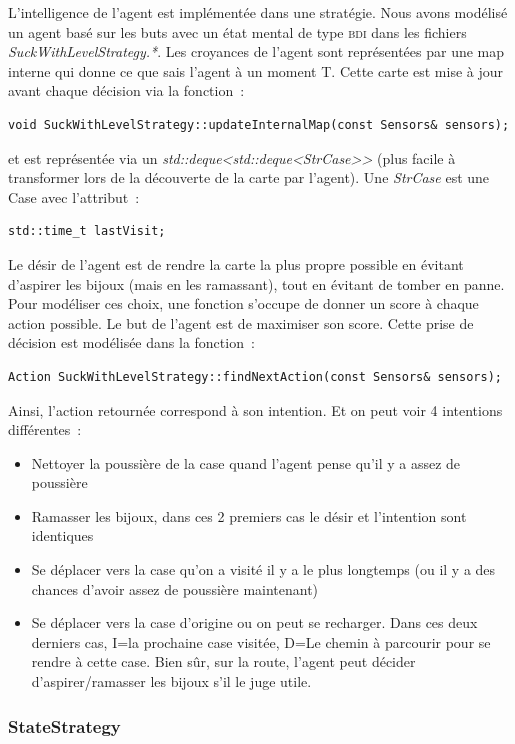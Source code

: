 \documentclass{article}
\begin{document}
L'intelligence de l'agent est implémentée dans une stratégie. Nous avons modélisé un agent basé sur les buts avec un état mental de type \textsc{bdi} dans les fichiers \emph{SuckWithLevelStrategy.*}. Les croyances de l'agent sont représentées par une map interne qui donne ce que sais l'agent à un moment T. Cette carte est mise à jour avant chaque décision via la fonction~:
\begin{verbatim}
void SuckWithLevelStrategy::updateInternalMap(const Sensors& sensors);
\end{verbatim}
et est représentée via un \emph{std::deque<std::deque<StrCase>>} (plus facile à transformer lors de la découverte de la carte par l'agent). Une \emph{StrCase} est une Case avec l'attribut~:
\begin{verbatim}
std::time_t lastVisit;
\end{verbatim}

Le désir de l'agent est de rendre la carte la plus propre possible en évitant d'aspirer les bijoux (mais en les ramassant), tout en évitant de tomber en panne. Pour modéliser ces choix, une fonction s'occupe de donner un score à chaque action possible. Le but de l'agent est de maximiser son score. Cette prise de décision est modélisée dans la fonction~:
\begin{verbatim}
Action SuckWithLevelStrategy::findNextAction(const Sensors& sensors);
\end{verbatim}
Ainsi, l'action retournée correspond à son intention. Et on peut voir 4 intentions différentes~:
\begin{itemize}
    \item Nettoyer la poussière de la case quand l'agent pense qu'il y a assez de poussière
    \item Ramasser les bijoux, dans ces 2 premiers cas le désir et l'intention sont identiques
    \item Se déplacer vers la case qu'on a visité il y a le plus longtemps (ou il y a des chances d'avoir assez de poussière maintenant)
    \item Se déplacer vers la case d'origine ou on peut se recharger. Dans ces deux derniers cas, I=la prochaine case visitée, D=Le chemin à parcourir pour se rendre à cette case. Bien sûr, sur la route, l'agent peut décider d'aspirer/ramasser les bijoux s'il le juge utile.
\end{itemize}

\subsubsection{StateStrategy}
\end{document}
